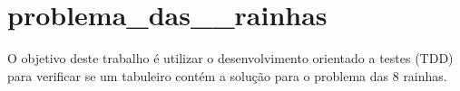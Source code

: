 \chapter{problema\+\_\+das\+\_\+\_\+rainhas}
\hypertarget{md_README}{}\label{md_README}
\label{md_README_autotoc_md0}%
%
O objetivo deste trabalho é utilizar o desenvolvimento orientado a testes (TDD) para verificar se um tabuleiro contém a solução para o problema das 8 rainhas. 